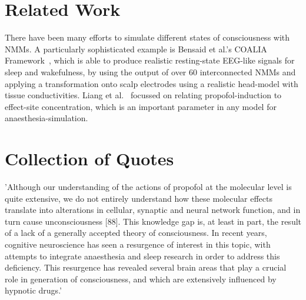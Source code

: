 \section{Related Work}\label{sec:related-work}
There have been many efforts to simulate different states of consciousness with NMMs. A particularly sophisticated
example is Bensaid et al.'s COALIA Framework~\cite{bensaid_coalia_2019}, which is able to produce realistic
resting-state EEG-like signals for sleep and wakefulness, by using the output of over 60 interconnected NMMs and
applying a transformation onto scalp electrodes using a realistic head-model with tissue conductivities.
Liang et al.~\cite{liang_pharmacokinetics-neural_2015} focussed on relating propofol-induction to effect-site
concentration, which is an important parameter in any model for anaesthesia-simulation.

\section{Collection of Quotes}

'Although our understanding of the actions of propofol at the molecular level is quite extensive,
we do not entirely understand how these molecular effects translate into alterations in cellular,
synaptic and neural network function, and in turn cause unconsciousness [88].
This knowledge gap is, at least in part, the result of a lack of a generally accepted theory of consciousness.
In recent years, cognitive neuroscience has seen a resurgence of interest in this topic,
with attempts to integrate anaesthesia and sleep research in order to address this deficiency.
This resurgence has revealed several brain areas that play a crucial role in generation of consciousness,
and which are extensively influenced by hypnotic drugs.'
\cite{sahinovic_clinical_2018}\\[1em]


